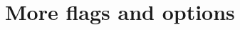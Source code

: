 \documentclass[a4paper,english,11pt]{scrartcl}
\theoremstyle{definition}
\theoremstyle{remark}
\begin{document}




\section{More flags and options}
\end{document}
